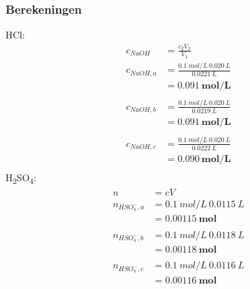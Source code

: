\documentclass[10pt,twoside]{report}
\begin{document}
\subsubsection{Berekeningen}
\begin{multicols}{2}
    HCl:\\
    \begin{equation*}
        \begin{split}
            c_{NaOH} &= \frac{c_2V_2}{V_1}\\
            c_{NaOH,a} &= \frac{0.1\ mol/L\ 0.020\ L}{0.0221\ L}\\
                    &= \mathbf{0.091\ mol/L}\\\\
            c_{NaOH,b} &= \frac{0.1\ mol/L\ 0.020\ L}{0.0219\ L}\\
                    &= \mathbf{0.091\ mol/L}\\\\
            c_{NaOH,c} &= \frac{0.1\ mol/L\ 0.020\ L}{0.0222\ L}\\
                    &= \mathbf{0.090\ mol/L}\\
        \end{split}
    \end{equation*}
\break
    H\textsubscript{2}SO\textsubscript{4}:\\
    \begin{equation*}
        \begin{split}
            n &= cV\\
            n_{HSO_4^-,a} &= 0.1\ mol/L\ 0.0115\ L\\
                &= \mathbf{0.00115\ mol}\\\\
            n_{HSO_4^-,b} &= 0.1\ mol/L\ 0.0118\ L\\
                &= \mathbf{0.00118\ mol}\\\\
            n_{HSO_4^-,c} &= 0.1\ mol/L\ 0.0116\ L\\
                &= \mathbf{0.00116\ mol}\\\\
        \end{split}
    \end{equation*}
\end{multicols}
\end{document}
